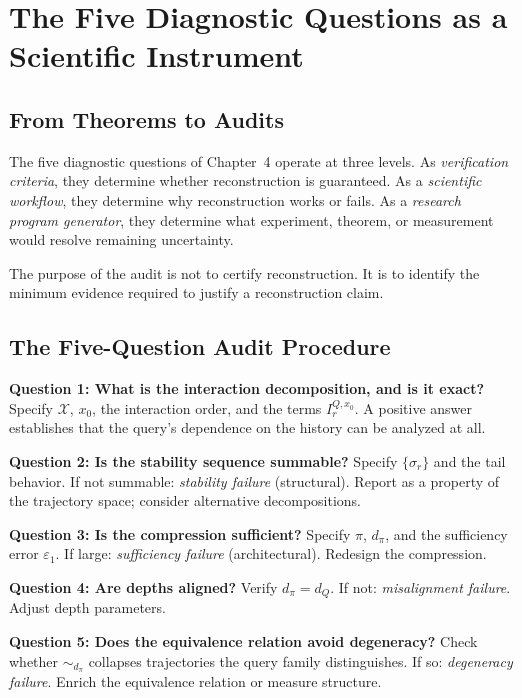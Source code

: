 \chapter{The Five Diagnostic Questions as a Scientific Instrument}

\section{From Theorems to Audits}

The five diagnostic questions of Chapter~4 operate at three levels. As \emph{verification criteria}, they determine whether reconstruction is guaranteed. As a \emph{scientific workflow}, they determine why reconstruction works or fails. As a \emph{research program generator}, they determine what experiment, theorem, or measurement would resolve remaining uncertainty.

The purpose of the audit is not to certify reconstruction. It is to identify the minimum evidence required to justify a reconstruction claim.

\section{The Five-Question Audit Procedure}

\textbf{Question 1: What is the interaction decomposition, and is it exact?}
Specify $\mathcal{X}$, $x_0$, the interaction order, and the terms $I_r^{Q,x_0}$. A positive answer establishes that the query's dependence on the history can be analyzed at all.

\textbf{Question 2: Is the stability sequence summable?}
Specify $\{\sigma_r\}$ and the tail behavior. If not summable: \emph{stability failure} (structural). Report as a property of the trajectory space; consider alternative decompositions.

\textbf{Question 3: Is the compression sufficient?}
Specify $\pi$, $d_\pi$, and the sufficiency error $\varepsilon_1$. If large: \emph{sufficiency failure} (architectural). Redesign the compression.

\textbf{Question 4: Are depths aligned?}
Verify $d_\pi = d_Q$. If not: \emph{misalignment failure}. Adjust depth parameters.

\textbf{Question 5: Does the equivalence relation avoid degeneracy?}
Check whether $\sim_{d_\pi}$ collapses trajectories the query family distinguishes. If so: \emph{degeneracy failure}. Enrich the equivalence relation or measure structure.

